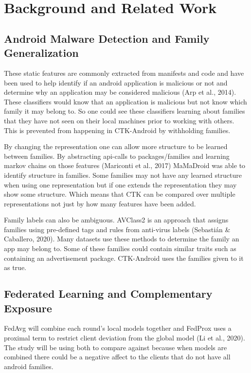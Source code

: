 \documentclass[12pt,letterpaper]{article}
\begin{document}
\section*{Background and Related Work}

\subsection*{Android Malware Detection and Family Generalization}

These static features are commonly extracted from manifests and code and have been used to help identify if an android application is malicious or not and determine why an application may be considered malicious (Arp et al., 2014). These classifiers would know that an application is malicious but not know which family it may belong to. So one could see these classifiers learning about families that they have not seen on their local machines prior to working with others. This is prevented from happening in CTK-Android by withholding families.

By changing the representation one can allow more structure to be learned between families. By abstracting api-calls to packages/families and learning markov chains on those features (Mariconti et al., 2017) MaMaDroid was able to identify structure in families. Some families may not have any learned structure when using one representation but if one extends the representation they may show some structure. Which means that CTK can be compared over multiple representations not just by how many features have been added.

Family labels can also be ambiguous. AVClass2 is an approach that assigns families using pre-defined tags and rules from anti-virus labels (Sebastián \& Caballero, 2020). Many datasets use these methods to determine the family an app may belong to. Some of these families could contain similar traits such as containing an advertisement package. CTK-Android uses the families given to it as true.

\subsection*{Federated Learning and Complementary Exposure} 

FedAvg will combine each round's local models together and FedProx uses a proximal term to restrict client deviation from the global model (Li et al., 2020). The study will be using both to compare against because when models are combined there could be a negative affect to the clients that do not have all android families.
\end{document}
